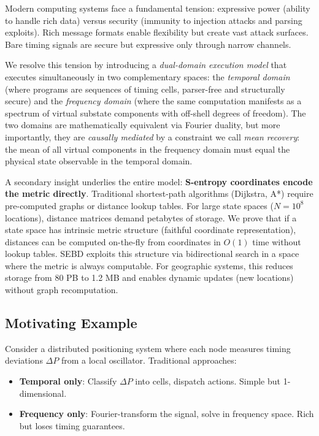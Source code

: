 \documentclass[twocolumn,11pt,a4paper]{article}
\newcommand{\DP}{\Delta P}
\begin{document}
Modern computing systems face a fundamental tension: expressive power (ability to handle rich data) versus security (immunity to injection attacks and parsing exploits). Rich message formats enable flexibility but create vast attack surfaces. Bare timing signals are secure but expressive only through narrow channels.

We resolve this tension by introducing a \emph{dual-domain execution model} that executes simultaneously in two complementary spaces: the \emph{temporal domain} (where programs are sequences of timing cells, parser-free and structurally secure) and the \emph{frequency domain} (where the same computation manifests as a spectrum of virtual substate components with off-shell degrees of freedom). The two domains are mathematically equivalent via Fourier duality, but more importantly, they are \emph{causally mediated} by a constraint we call \emph{mean recovery}: the mean of all virtual components in the frequency domain must equal the physical state observable in the temporal domain.

A secondary insight underlies the entire model: \textbf{S-entropy coordinates encode the metric directly}. Traditional shortest-path algorithms (Dijkstra, A*) require pre-computed graphs or distance lookup tables. For large state spaces ($N = 10^8$ locations), distance matrices demand petabytes of storage. We prove that if a state space has intrinsic metric structure (faithful coordinate representation), distances can be computed on-the-fly from coordinates in $O(1)$ time without lookup tables. SEBD exploits this structure via bidirectional search in a space where the metric is always computable. For geographic systems, this reduces storage from 80 PB to 1.2 MB and enables dynamic updates (new locations) without graph recomputation.

\subsection{Motivating Example}

Consider a distributed positioning system where each node measures timing deviations $\DP$ from a local oscillator. Traditional approaches:
\begin{itemize}[nosep]
  \item \textbf{Temporal only}: Classify $\DP$ into cells, dispatch actions. Simple but 1-dimensional.
  \item \textbf{Frequency only}: Fourier-transform the signal, solve in frequency space. Rich but loses timing guarantees.
\end{itemize}
\end{document}
